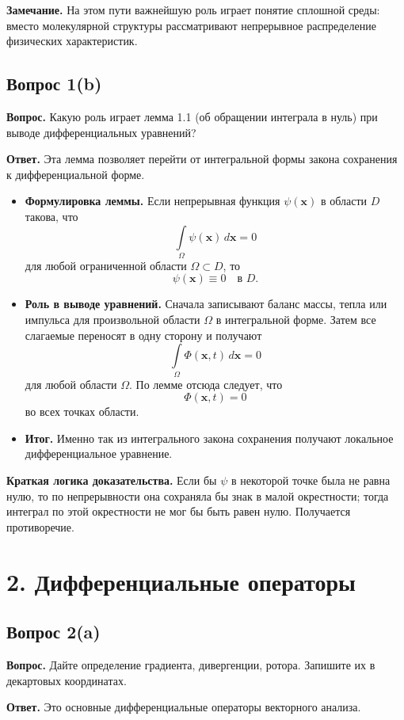 \documentclass[a4paper,12pt]{article}
\newcommand{\Question}[2]{\subsection*{Вопрос #1}\textbf{Вопрос.} #2}
\newcommand{\Answer}{\textbf{Ответ.}}
\begin{document}
\textbf{Замечание.} На этом пути важнейшую роль играет понятие сплошной среды: вместо молекулярной структуры рассматривают непрерывное распределение физических характеристик.

\Question{1(b)}{Какую роль играет лемма 1.1 (об обращении интеграла в нуль) при выводе дифференциальных уравнений?}

\Answer
Эта лемма позволяет перейти от интегральной формы закона сохранения к дифференциальной форме.

\begin{itemize}
  \item \textbf{Формулировка леммы.} Если непрерывная функция $\psi(\mathbf{x})$ в области $D$ такова, что
  \[
  \int\limits_{\Omega}\psi(\mathbf{x})\,d\mathbf{x}=0
  \]
  для любой ограниченной области $\Omega\subset D$, то
  \[
  \psi(\mathbf{x})\equiv 0 \quad \text{в } D.
  \]
  \item \textbf{Роль в выводе уравнений.} Сначала записывают баланс массы, тепла или импульса для произвольной области $\Omega$ в интегральной форме. Затем все слагаемые переносят в одну сторону и получают
  \[
  \int\limits_{\Omega}\Phi(\mathbf{x},t)\,d\mathbf{x}=0
  \]
  для любой области $\Omega$. По лемме отсюда следует, что
  \[
  \Phi(\mathbf{x},t)=0
  \]
  во всех точках области.
  \item \textbf{Итог.} Именно так из интегрального закона сохранения получают локальное дифференциальное уравнение.
\end{itemize}

\textbf{Краткая логика доказательства.} Если бы $\psi$ в некоторой точке была не равна нулю, то по непрерывности она сохраняла бы знак в малой окрестности; тогда интеграл по этой окрестности не мог бы быть равен нулю. Получается противоречие.

\section*{2. Дифференциальные операторы}

\Question{2(a)}{Дайте определение градиента, дивергенции, ротора. Запишите их в декартовых координатах.}

\Answer
Это основные дифференциальные операторы векторного анализа.
\end{document}
